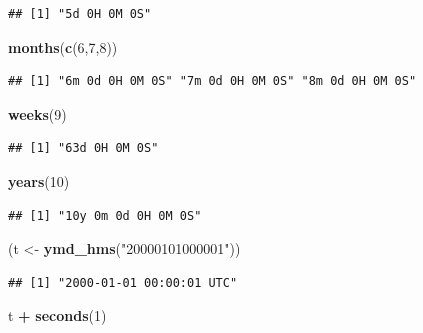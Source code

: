 \documentclass[]{book}
\newenvironment{Shaded}{\begin{snugshade}}{\end{snugshade}}
\newcommand{\DecValTok}[1]{\textcolor[rgb]{0.00,0.00,0.81}{#1}}
\newcommand{\KeywordTok}[1]{\textcolor[rgb]{0.13,0.29,0.53}{\textbf{#1}}}
\newcommand{\NormalTok}[1]{#1}
\newcommand{\OperatorTok}[1]{\textcolor[rgb]{0.81,0.36,0.00}{\textbf{#1}}}
\newcommand{\StringTok}[1]{\textcolor[rgb]{0.31,0.60,0.02}{#1}}
\theoremstyle{definition}
\theoremstyle{definition}
\theoremstyle{definition}
\theoremstyle{remark}
\begin{document}
\begin{verbatim}
## [1] "5d 0H 0M 0S"
\end{verbatim}

\begin{Shaded}
\begin{Highlighting}[]
\KeywordTok{months}\NormalTok{(}\KeywordTok{c}\NormalTok{(}\DecValTok{6}\NormalTok{,}\DecValTok{7}\NormalTok{,}\DecValTok{8}\NormalTok{))}
\end{Highlighting}
\end{Shaded}

\begin{verbatim}
## [1] "6m 0d 0H 0M 0S" "7m 0d 0H 0M 0S" "8m 0d 0H 0M 0S"
\end{verbatim}

\begin{Shaded}
\begin{Highlighting}[]
\KeywordTok{weeks}\NormalTok{(}\DecValTok{9}\NormalTok{)}
\end{Highlighting}
\end{Shaded}

\begin{verbatim}
## [1] "63d 0H 0M 0S"
\end{verbatim}

\begin{Shaded}
\begin{Highlighting}[]
\KeywordTok{years}\NormalTok{(}\DecValTok{10}\NormalTok{)}
\end{Highlighting}
\end{Shaded}

\begin{verbatim}
## [1] "10y 0m 0d 0H 0M 0S"
\end{verbatim}

\begin{Shaded}
\begin{Highlighting}[]
\NormalTok{(t <-}\StringTok{ }\KeywordTok{ymd_hms}\NormalTok{(}\StringTok{"20000101000001"}\NormalTok{))}
\end{Highlighting}
\end{Shaded}

\begin{verbatim}
## [1] "2000-01-01 00:00:01 UTC"
\end{verbatim}

\begin{Shaded}
\begin{Highlighting}[]
\NormalTok{t }\OperatorTok{+}\StringTok{ }\KeywordTok{seconds}\NormalTok{(}\DecValTok{1}\NormalTok{)}
\end{Highlighting}
\end{Shaded}
\end{document}
